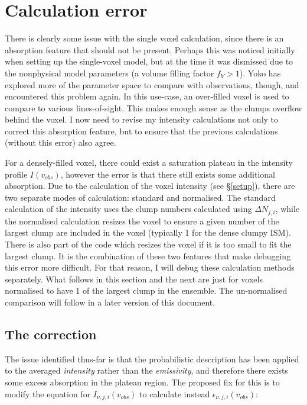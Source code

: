 \documentclass[a4paper]{article}
\begin{document}

    \section{Calculation error}

    There is clearly some issue with the single voxel calculation, since there is an absorption feature that should not be present.
    Perhaps this was noticed initially when setting up the single-voxel model, but at the time it was dismissed due to the nonphysical model parameters (a volume filling factor \(f_V > 1\)).
    Yoko has explored more of the parameter space to compare with observations, though, and encountered this problem again.
    In this use-case, an over-filled voxel is used to compare to various lines-of-sight.
    This makes enough sense as the clumps overflow behind the voxel.
    I now need to revise my intensity calculations not only to correct this absorption feature, but to ensure that the previous calculations (without this error) also agree.

    For a densely-filled voxel, there could exist a saturation plateau in the intensity profile \(I(v_{obs})\), however the error is that there still exists some additional absorption.
    Due to the calculation of the voxel intensity (see \S \ref{setup}), there are two separate modes of calculation: standard and normalised.
    The standard calculation of the intensity uses the clump numbers calculated using \(\Delta N_{j,i}\), while the normalised calculation resizes the voxel to ensure a given number of the largest clump are included in the voxel (typically 1 for the dense clumpy ISM).
    There is also part of the code which resizes the voxel if it is too small to fit the largest clump.
    It is the combination of these two features that make debugging this error more difficult.
    For that reason, I will debug these calculation methods separately.
    What follows in this section and the next are just for voxels normalised to have 1 of the largest clump in the ensemble.
    The un-normalised comparison will follow in a later version of this document.

    \subsection{The correction}

    The issue identified thus-far is that the probabilistic description has been applied to the averaged \textit{intensity} rather than the \textit{emissivity}, and therefore there exists some excess absorption in the plateau region.
    The proposed fix for this is to modify the equation for \(I_{\nu, j, i} (v_{obs})\) to calculate instead \(\epsilon_{\nu, j, i} (v_{obs})\):
\end{document}
